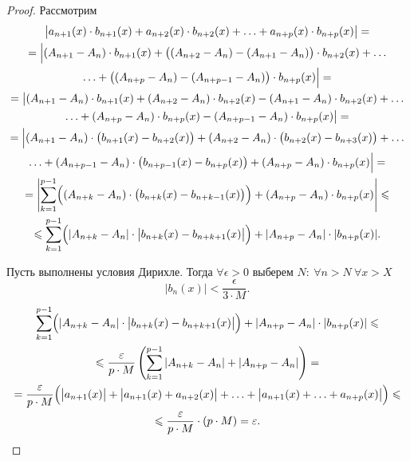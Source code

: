 \begin{proof}
    Рассмотрим
    \begin{multline*}
        \big|a_{n+1}(x)\cdot b_{n+1}(x) + a_{n+2}(x)\cdot b_{n+2}(x) + \ldots + a_{n+p}(x)\cdot b_{n+p}(x)\big| = \\
        = \Big|(A_{n+1} - A_n)\cdot b_{n+1}(x) + \big((A_{n+2} - A_n) - (A_{n+1} - A_n)\big)\cdot b_{n+2}(x) + \ldots \\
        \ldots + \big((A_{n+p} -A_n) - (A_{n+p-1} - A_n)\big)\cdot b_{n+p}(x)\Big| = \\
        = \big|(A_{n+1} - A_n)\cdot b_{n+1}(x) + (A_{n+2} - A_n)\cdot b_{n+2}(x) - (A_{n+1} - A_n)\cdot b_{n+2}(x) + \ldots \\
        \ldots + (A_{n+p} -A_n)\cdot b_{n+p}(x) - (A_{n+p-1} - A_n)\cdot b_{n+p}(x)\big| = \\
        = \Big|(A_{n+1}-A_n)\cdot\big(b_{n+1}(x)-b_{n+2}(x)\big) + (A_{n+2}-A_n)\cdot\big(b_{n+2}(x)-b_{n+3}(x)\big) + \ldots \\
        \ldots + (A_{n+p-1}-A_n)\cdot\big(b_{n+p-1}(x)-b_{n+p}(x)\big) + (A_{n+p} - A_n)\cdot b_{n+p}(x)\Big| = \\
        = \left|\sum_{k=1}^{p-1}\Bigl((A_{n+k} - A_n)\cdot\big(b_{n+k}(x) - b_{n+k-1}(x)\big)\Bigr) + (A_{n+p} - A_n)\cdot b_{n+p}(x) \right| \leqslant \\
        \leqslant \sum_{k=1}^{p-1}\Bigl(|A_{n+k} - A_n| \cdot \big|b_{n+k}(x) - b_{n+k+1}(x)\big|\Bigr) + | A_{n+p} - A_n | \cdot | b_{n+p}(x) |.
    \end{multline*}

    Пусть выполнены условия Дирихле. Тогда $ \forall \epsilon > 0 $ выберем $ N: \ \forall n > N \ \forall x > X $
    \[
        \big|b_n(x)\big| < \frac{\epsilon}{3\cdot M}.
    \]
    \begin{multline*}
        \sum_{k=1}^{p-1}\Bigl(|A_{n+k} - A_n| \cdot \big|b_{n+k}(x) - b_{n+k+1}(x)\big|\Bigr) + | A_{n+p} - A_n | \cdot | b_{n+p}(x) | \leqslant \\
        \leqslant \frac{\epsilon}{p\cdot M}\left(\sum_{k=1}^{p-1}| A_{n+k} - A_n | + | A_{n+p} - A_n |  \right) = \\
        = \frac{\epsilon}{p\cdot M}\Big(\big| a_{n+1}(x) \big| + \big|a_{n+1}(x) + a_{n+2}(x)\big| + \ldots + \big|a_{n+1}(x) + \ldots + a_{n+p}(x)\big|\Big) \leqslant \\
        \leqslant \frac{\epsilon}{p\cdot M}\cdot (p \cdot M) = \epsilon.
    \end{multline*}
\end{proof}